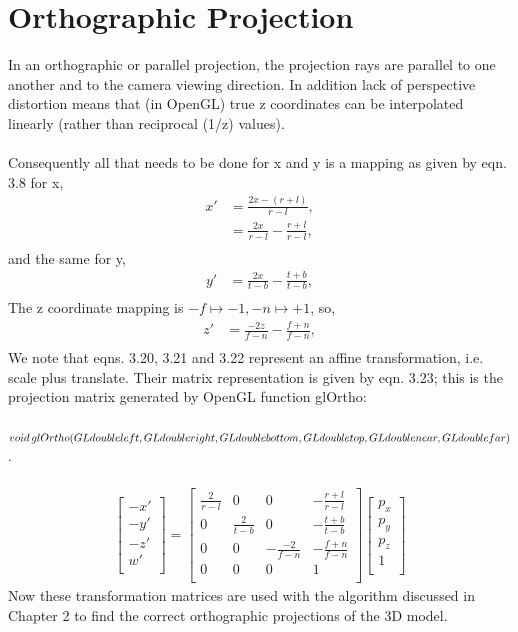 \documentclass[
11pt, %
english, %
singlespacing, %
headsepline, %
]{MastersDoctoralThesis} %
\begin{document}
\section{Orthographic Projection}
In an orthographic or parallel projection, the projection rays are parallel to one another and to the camera viewing direction. In addition lack of perspective distortion means that (in OpenGL) true z coordinates can be interpolated linearly (rather than reciprocal (1/z) values). \\ \\
Consequently all that needs to be done for x and y is a mapping as given by eqn. 3.8 for x,
\begin{align*} x'&= \frac{2x - (r+l)}{r-l}, \tag{3.19} \\
&= \frac{2x}{r-l} - \frac{r+l}{r-l}, \tag{3.20} \\
\end{align*}
and the same for y,
\begin{align*} y'&= \frac{2x}{t-b} - \frac{t+b}{t-b}, \tag{3.21} \\
\end{align*}
The z coordinate mapping is $-f \mapsto -1, -n \mapsto +1$, so,
\begin{align*} z'&= \frac{-2z}{f-n} - \frac{f+n}{f-n}, \tag{3.22} \\
\end{align*}
We note that eqns. 3.20, 3.21 and 3.22 represent an affine transformation, i.e. scale plus translate. Their matrix representation is given by eqn. 3.23; this is the projection matrix generated by OpenGL function glOrtho:\\ \\
$ void \, glOrtho(GLdouble left, GLdouble right, \\ GLdouble bottom, GLdouble top, GLdouble near, GLdouble far)$.\\ \\
\begin{align*} 
\begin{bmatrix}
-x' \\ -y' \\ -z' \\ w' \\ 
\end{bmatrix} = 
\begin{bmatrix}
\frac{2}{r-l} & 0 & 0 & -\frac{r+l}{r-l} \\
0 & \frac{2}{t-b} & 0 & -\frac{t+b}{t-b}  \\
0 & 0 & -\frac{-2}{f-n} & -\frac{f+n}{f-n}  \\
0 & 0 & 0 & 1 \\
\end{bmatrix}
\begin{bmatrix}
p_x \\ p_y \\ p_z \\ 1 \\
\end{bmatrix} \tag{3.23}
\end{align*}
Now these transformation matrices are used with the algorithm discussed in Chapter 2 to find the correct orthographic projections of the 3D model. 
\end{document}
